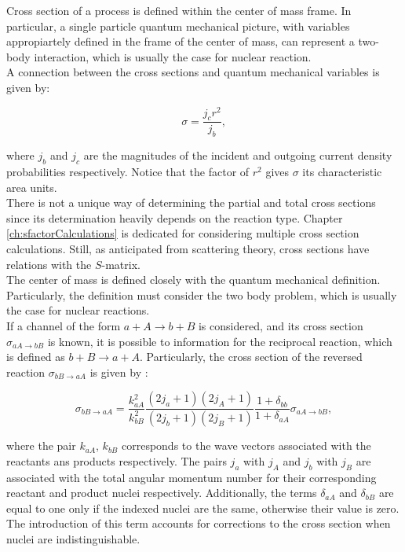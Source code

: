 \documentclass[openany]{book}
\begin{document}
Cross section of a process is defined within the center of mass frame. In particular, a single particle quantum mechanical picture, with variables appropiartely defined in the frame of the center of mass, can represent a two-body interaction, which is usually the case for nuclear reaction. \\

A connection between the cross sections and quantum mechanical variables is given by: 

\begin{equation}\label{eq:nuclearReaction_crossSection_quantumMechanics}
	\sigma = \frac{j_c r^2 }{j_b},
\end{equation}

where $j_b$ and $j_c$ are the magnitudes of the incident and outgoing current density probabilities respectively. Notice that the factor of $r^2$ gives $\sigma$ its characteristic area units. \\

There is not a unique way of determining the partial and total cross sections since its determination heavily depends  on the reaction type. Chapter \ref{ch:sfactorCalculations} is dedicated for considering multiple cross section calculations. Still, as anticipated from scattering theory, cross sections have relations with the $S$-matrix. \\

The center of mass is defined closely with the quantum mechanical definition. Particularly, the definition must consider the two body problem, which is usually the case for nuclear reactions. \\

If a channel of the form $a + A \rightarrow b + B$ is considered, and its cross section $\sigma_{aA \rightarrow bB}$ is known, it is possible to information for the reciprocal reaction, which is defined as  $ b + B \rightarrow a + A$. Particularly, the cross section of the reversed reaction $\sigma_{bB \rightarrow aA}$  is given by  \cite{iliadis_2015}:

\begin{equation}\label{eq:nuclearReaction_reciprocal}
	  \sigma_{bB \rightarrow aA} = \frac{k^2_{aA}}{k^2_{bB}} \frac{(2j_a + 1)(2j_A + 1) }{ (2j_b + 1)(2j_B + 1) } \frac{1 + \delta_{bb}}{1 + \delta_{aA}} \sigma_{aA \rightarrow bB} ,  
\end{equation}

where the pair $k_{aA}$, $k_{bB}$ corresponds to the wave vectors associated with the reactants ans products respectively. The pairs $j_a$ with $j_A$ and $j_b$ with $j_B$ are associated with the total angular momentum number for their corresponding reactant and product nuclei respectively. Additionally, the terms $\delta_{aA}$ and  $\delta_{bB}$ are equal to one only if the indexed nuclei are the same, otherwise their value is zero. The introduction of this term accounts for corrections to the cross section when nuclei are indistinguishable. 
\end{document}

